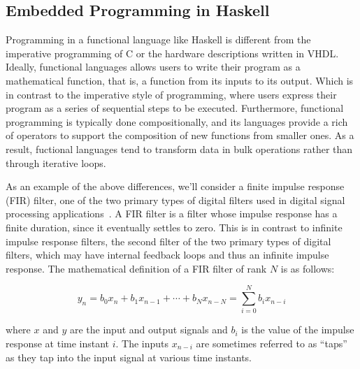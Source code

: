 
\subsection{Embedded Programming in Haskell}
\label{haskell}

Programming in a functional language like Haskell is different from the imperative programming of C or the hardware descriptions written in VHDL. Ideally, functional languages allows users to write their program as a mathematical function, that is, a function from its inputs to its output. Which is in contrast to the imperative style of programming, where users express their program as a series of sequential steps to be executed. Furthermore, functional programming is typically done compositionally, and its languages provide a rich of operators to support the composition of new functions from smaller ones. As a result, fuctional languages tend to transform data in bulk operations rather than through iterative loops.

As an example of the above differences, we'll consider a finite impulse response (FIR) filter, one of the two primary types of digital filters used in digital signal processing applications~\cite{oppenheim1989}. A FIR filter is a filter whose impulse response has a finite duration, since it eventually settles to zero. This is in contrast to infinite impulse response filters, the second filter of the two primary types of digital filters, which may have internal feedback loops and thus an infinite impulse response. The mathematical definition of a FIR filter of rank $N$ is as follows:

\vspace{-2mm}
\begin{equation}
y_{n} = b_{0} x_{n} + b_{1} x_{n-1} + \cdots + b_{N} x_{n-N} = \sum_{i=0}^{N} b_{i} x_{n-i}
\end{equation}
\vspace{1mm}

\noindent where $x$ and $y$ are the input and output signals and $b_i$ is the value of the impulse response at time instant $i$. The inputs $x_{n-i}$ are sometimes referred to as ``taps'' as they tap into the input signal at various time instants. 

